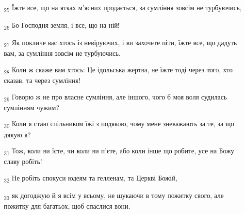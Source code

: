 \begin{tcolorbox}
\textsubscript{25} Їжте все, що на ятках м'ясних продається, за сумління зовсім не турбуючись,
\end{tcolorbox}
\begin{tcolorbox}
\textsubscript{26} Бо Господня земля, і все, що на ній!
\end{tcolorbox}
\begin{tcolorbox}
\textsubscript{27} Як покличе вас хтось із невіруючих, і ви захочете піти, їжте все, що дадуть вам, за сумління зовсім не турбуючись.
\end{tcolorbox}
\begin{tcolorbox}
\textsubscript{28} Коли ж скаже вам хтось: Це ідольська жертва, не їжте тоді через того, хто сказав, та через сумління!
\end{tcolorbox}
\begin{tcolorbox}
\textsubscript{29} Говорю ж не про власне сумління, але іншого, чого б моя воля судилась сумлінням чужим?
\end{tcolorbox}
\begin{tcolorbox}
\textsubscript{30} Коли я стаю спільником їжі з подякою, чому мене зневажають за те, за що дякую я?
\end{tcolorbox}
\begin{tcolorbox}
\textsubscript{31} Тож, коли ви їсте, чи коли ви п'єте, або коли інше що робите, усе на Божу славу робіть!
\end{tcolorbox}
\begin{tcolorbox}
\textsubscript{32} Не робіть спокуси юдеям та гелленам, та Церкві Божій,
\end{tcolorbox}
\begin{tcolorbox}
\textsubscript{33} як догоджую й я всім у всьому, не шукаючи в тому пожитку свого, але пожитку для багатьох, щоб спаслися вони.
\end{tcolorbox}
